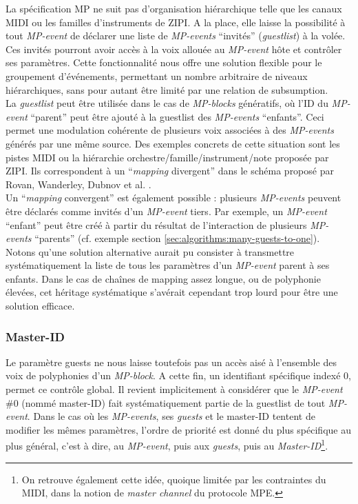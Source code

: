 \noindent La spécification MP ne suit pas d'organisation hiérarchique telle que les canaux \gls{MIDI} ou les familles d'instruments de \gls{ZIPI}. A la place, elle laisse la possibilité à tout \textit{MP-event} de déclarer une liste de \textit{MP-events} ``invités'' (\textit{guestlist}) à la volée. Ces invités pourront avoir accès à la voix allouée au \textit{MP-event} hôte et contrôler ses paramètres. Cette fonctionnalité nous offre une solution flexible pour le groupement d'événements, permettant un nombre arbitraire de niveaux hiérarchiques, sans pour autant être limité par une relation de subsumption.\\
\indent La \textit{guestlist} peut être utilisée dans le cas de \textit{MP-blocks} génératifs, où l'ID du \textit{MP-event} ``parent'' peut être ajouté à la guestlist des \textit{MP-events} ``enfants''. Ceci permet une modulation cohérente de plusieurs voix associées à des \textit{MP-events} générés par une même source. Des exemples concrets de cette situation sont les pistes \gls{MIDI} ou la hiérarchie orchestre/famille/instrument/note proposée par \gls{ZIPI}. Ils correspondent à un ``\textit{\gls{mapping}} divergent'' dans le schéma proposé par Rovan, Wanderley, Dubnov et al. \cite{rovan_instrumental_1997}.\\
\indent Un ``\textit{\gls{mapping}} convergent'' est également possible : plusieurs \textit{MP-events} peuvent être déclarés comme invités d'un \textit{MP-event} tiers. Par exemple, un \textit{MP-event} ``enfant'' peut être créé à partir du résultat de l'interaction de plusieurs \textit{MP-events} ``parents'' (cf. exemple section \ref{sec:algorithms:many-guests-to-one}).
\indent Notons qu'une solution alternative aurait pu consister à transmettre systématiquement la liste de tous les paramètres d'un \textit{MP-event} parent à ses enfants. Dans le cas de chaînes de mapping assez longue, ou de polyphonie élevées, cet héritage systématique s'avérait cependant trop lourd pour être une solution efficace.


\subsubsection{Master-ID}

\noindent Le paramètre guests ne nous laisse toutefois pas un accès aisé à l'ensemble des voix de polyphonies d'un \textit{MP-block}. A cette fin, un identifiant spécifique indexé 0, permet ce contrôle global. Il revient implicitement à considérer que le \textit{MP-event} \#0 (nommé master-ID) fait systématiquement partie de la guestlist de tout \textit{MP-event}. Dans le cas où les \textit{MP-events}, ses \textit{guests} et le master-ID tentent de modifier les mêmes paramètres, l'ordre de priorité est donné du plus spécifique au plus général, c'est à dire, au \textit{MP-event}, puis aux \textit{guests}, puis au \textit{Master-ID}\footnote{On retrouve également cette idée, quoique limitée par les contraintes du \gls{MIDI}, dans la notion de \textit{master channel} du protocole \gls{MPE}.}.

